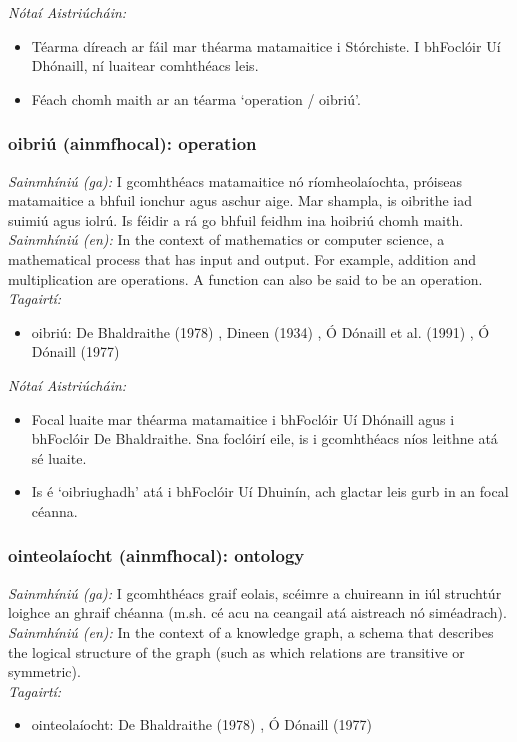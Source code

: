 \documentclass{article}
\begin{document}
 \noindent \textit{Nótaí Aistriúcháin:}
\begin{itemize}
	\item Téarma díreach ar fáil mar théarma matamaitice i Stórchiste. I bhFoclóir Uí Dhónaill, ní luaitear comhthéacs leis.
	\item Féach chomh maith ar an téarma `operation / oibriú'.
\end{itemize}


\subsubsection*{oibriú (ainmfhocal): operation}
 \noindent \textit{Sainmhíniú (ga):} I gcomhthéacs matamaitice nó ríomheolaíochta, próiseas matamaitice a bhfuil ionchur agus aschur aige. Mar shampla, is oibrithe iad suimiú agus iolrú. Is féidir a rá go bhfuil feidhm ina hoibriú chomh maith.
\\
 \noindent \textit{Sainmhíniú (en):} In the context of mathematics or computer science, a mathematical process that has input and output. For example, addition and multiplication are operations. A function can also be said to be an operation.
\\
 \noindent \textit{Tagairtí:}
\begin{itemize}
	\item oibriú: De Bhaldraithe (1978) \cite{de-bhaldraithe}, Dineen (1934) \cite{dineen}, Ó Dónaill et al. (1991) \cite{focloir-beag}, Ó Dónaill (1977) \cite{odonaill}
\end{itemize}

 \noindent \textit{Nótaí Aistriúcháin:}
\begin{itemize}
	\item Focal luaite mar théarma matamaitice i bhFoclóir Uí Dhónaill agus i bhFoclóir De Bhaldraithe. Sna foclóirí eile, is i gcomhthéacs níos leithne atá sé luaite.
	\item Is é `oibriughadh' atá i bhFoclóir Uí Dhuinín, ach glactar leis gurb in an focal céanna.
\end{itemize}


\subsubsection*{ointeolaíocht (ainmfhocal): ontology}
 \noindent \textit{Sainmhíniú (ga):} I gcomhthéacs graif eolais, scéimre a chuireann in iúl struchtúr loighce an ghraif chéanna (m.sh. cé acu na ceangail atá aistreach nó siméadrach).
\\
 \noindent \textit{Sainmhíniú (en):} In the context of a knowledge graph, a schema that describes the logical structure of the graph (such as which relations are transitive or symmetric).
\\
 \noindent \textit{Tagairtí:}
\begin{itemize}
	\item ointeolaíocht: De Bhaldraithe (1978) \cite{de-bhaldraithe}, Ó Dónaill (1977) \cite{odonaill}
\end{itemize}
\end{document}

